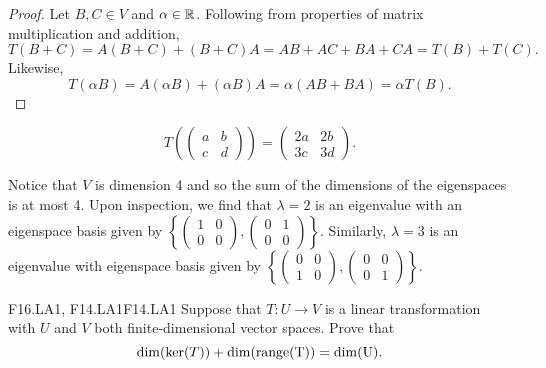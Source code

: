 \documentclass[../AlgebraQualSolutions.tex]{subfiles}
\begin{document}
	\begin{proof}
		Let $B,C \in V$ and $\alpha \in \mathbb{R}$. Following from properties of matrix multiplication and addition,
			\[T(B + C) = A(B+C) + (B+C)A = AB + AC + BA + CA = T(B) + T(C).\]
		Likewise,
			\[T(\alpha B) = A(\alpha B) + (\alpha B)A = \alpha(AB +BA) = \alpha T(B).\]
	\end{proof}

	\begin{solution}
		\[T\left(\begin{pmatrix} a & b \\ c & d \end{pmatrix}\right) = \begin{pmatrix} 2a & 2b \\ 3c & 3d \end{pmatrix}.\]
	\end{solution}

	\begin{solution}
		Notice that $V$ is dimension 4 and so the sum of the dimensions  of the eigenspaces is at most 4. Upon inspection, we find that $\lambda = 2$ is an eigenvalue with an eigenspace basis given by $\left\{ \begin{pmatrix} 1 & 0 \\ 0 & 0 \end{pmatrix}, \begin{pmatrix} 0 & 1 \\ 0 & 0 \end{pmatrix} \right\}$. Similarly, $\lambda = 3$ is an eigenvalue with eigenspace basis given by $\left\{ \begin{pmatrix} 0 & 0 \\ 1 & 0 \end{pmatrix}, \begin{pmatrix} 0 & 0 \\ 0 & 1 \end{pmatrix} \right\}$. 
	\end{solution}

	\begin{prob}{F16.LA1, F14.LA1}{F14.LA1}
		Suppose that $T: U \to V$ is a linear transformation with $U$ and $V$ both finite-dimensional vector spaces. Prove that
			\[\dim(\ker(T)) + \dim(\rm{range}(T)) = \dim(U).\]
	\end{prob}
\end{document}
